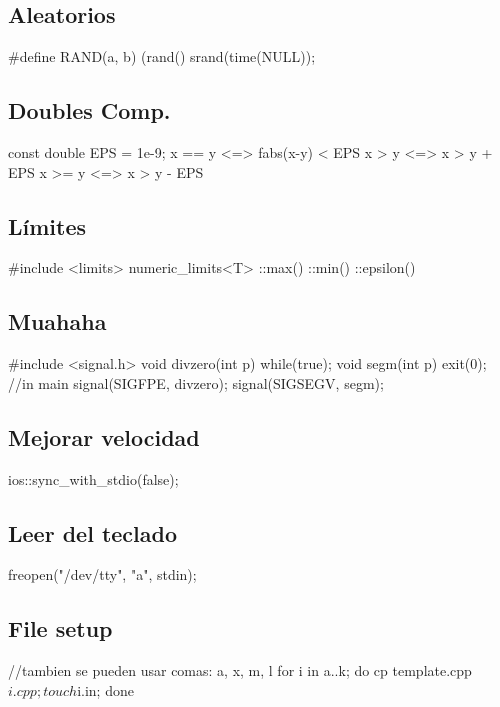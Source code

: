 \subsection*{Aleatorios}
\begin{code}
#define RAND(a, b) (rand()%
srand(time(NULL));
\end{code}
\subsection*{Doubles Comp.}
\begin{code}
const double EPS = 1e-9;
x == y	<=> fabs(x-y) < EPS
x >  y	<=> x > y + EPS
x >= y	<=> x > y - EPS
\end{code}
\subsection*{Límites}
\begin{code}
#include <limits>
numeric_limits<T>
	::max()
	::min()
	::epsilon()
\end{code}
\subsection*{Muahaha}
\begin{code}
#include <signal.h>
void divzero(int p){
	while(true);}
void segm(int p){
	exit(0);}
//in main
signal(SIGFPE, divzero);
signal(SIGSEGV, segm);
\end{code}
\subsection*{Mejorar velocidad}
\begin{code}
ios::sync_with_stdio(false);
\end{code}
\subsection*{Leer del teclado}
\begin{code}
freopen("/dev/tty", "a", stdin);
\end{code}
\subsection*{File setup}
\begin{code}
//tambien se pueden usar comas: {a, x, m, l}
for i in {a..k}; do cp template.cpp $i.cpp; touch $i.in; done
\end{code}

